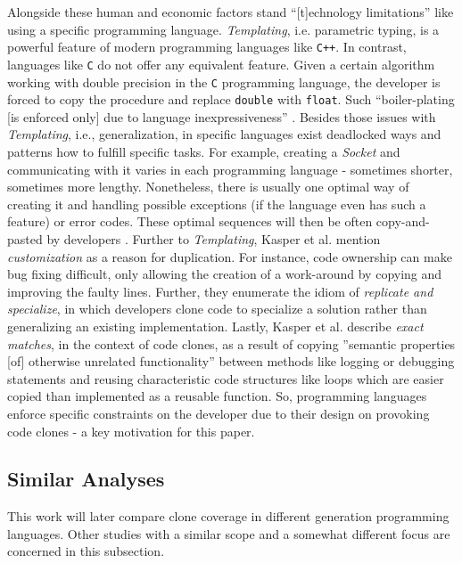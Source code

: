 Alongside these human and economic factors stand ``[t]echnology limitations'' \cite{kasper2006cloning} like using a specific programming language.
\textit{Templating}, i.e. parametric typing, is a powerful feature of modern programming languages like \texttt{C++}. In contrast, languages like \texttt{C} do not offer any equivalent feature.
Given a certain algorithm working with double precision in the \texttt{C} programming language, the developer is forced to copy the procedure and replace \texttt{double} with \texttt{float}. Such ``boiler-plating [is enforced only] due to language inexpressiveness'' \cite{kasper2006cloning}. 
Besides those issues with \textit{Templating}, i.e., generalization, in specific languages exist deadlocked ways and patterns how to fulfill specific tasks.
For example, creating a \textit{Socket} and communicating with it varies in each programming language - sometimes shorter, sometimes more lengthy. Nonetheless, there is usually one optimal way of creating it and handling possible exceptions (if the language even has such a feature) or error codes. 
These optimal sequences will then be often copy-and-pasted by developers \cite{kasper2006cloning}.
Further to \textit{Templating}, Kasper et al.  \cite{kasper2006cloning} mention \textit{customization} as a reason for duplication.
For instance, code ownership can make bug fixing difficult, only allowing the creation of a work-around by copying and improving the faulty lines.
Further, they enumerate the idiom of \textit{replicate and specialize}, in which developers clone code to specialize a solution rather than generalizing an existing implementation.
Lastly, Kasper et al. \cite{kasper2006cloning} describe \textit{exact matches}, in the context of code clones, as a result of copying ”semantic properties [of] otherwise unrelated functionality” \cite{kasper2006cloning} between methods like logging or debugging statements and reusing characteristic code structures like loops which are easier copied than implemented as a reusable function.
So, programming languages enforce specific constraints on the developer due to their design on provoking code clones - a key motivation for this paper.

\subsection{Similar Analyses}
\label{sec:similiar_analyses}

This work will later compare clone coverage in different generation programming languages. Other studies with a similar scope and a somewhat different focus are concerned in this subsection.

